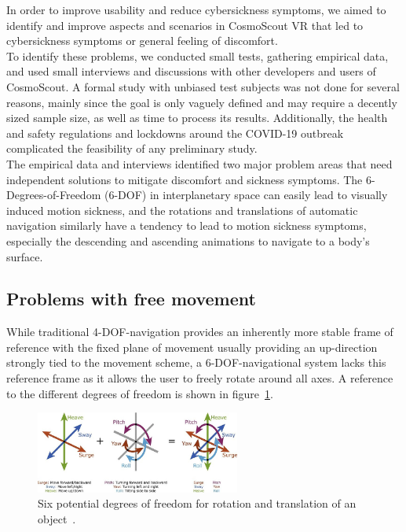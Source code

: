 In order to improve usability and reduce cybersickness symptoms, we aimed to identify and improve aspects and
scenarios in CosmoScout VR that led to cybersickness symptoms or general feeling of discomfort.
\\
To identify these problems, we conducted small tests, gathering empirical data, and used small interviews and
discussions with other developers and users of CosmoScout.
A formal study with unbiased test subjects was not done for several reasons, mainly since the goal is only vaguely
defined and may require a decently sized sample size, as well as time to process its results.
Additionally, the health and safety regulations and lockdowns around the COVID-19 outbreak complicated the feasibility
of any preliminary study.
\\
The empirical data and interviews identified two major problem areas that need independent solutions to mitigate
discomfort and sickness symptoms.
The 6-Degrees-of-Freedom (6-DOF) in interplanetary space can easily lead to visually induced motion sickness, and the
rotations and translations of automatic navigation similarly have a tendency to lead to motion sickness symptoms,
especially the descending and ascending animations to navigate to a body's surface.


\subsection{Problems with free movement}\label{subsec:problems-with-free-movement}

While traditional 4-DOF-navigation provides an inherently more stable frame of reference with the fixed plane of
movement usually providing an up-direction strongly tied to the movement scheme, a 6-DOF-navigational system lacks this
reference frame as it allows the user to freely rotate around all axes.
A reference to the different degrees of freedom is shown in figure~\ref{fig:6-dof-reference}.

\begin{figure}[h]
    \centering
    \includegraphics[width=0.6\textwidth]{content/3_current_state/img/6-DOF-reference[Fragaszy2018]}
    \caption{Six potential degrees of freedom for rotation and translation of an object~\cite{Fragaszy2018}.}
    \label{fig:6-dof-reference}
\end{figure}

